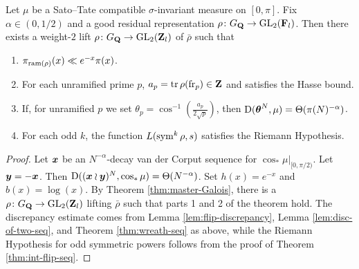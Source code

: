 \begin{theorem}
Let $\mu$ be a Sato--Tate compatible $\sigma$-invariant measure on $[0,\pi]$. 
Fix $\alpha\in (0,1/2)$ and a good residual representation 
$\rho\colon G_{\mathbf{Q}} \to \operatorname{GL}_2(\mathbf{F}_l)$. Then there exists a weight-$2$ lift 
$\rho\colon G_{\mathbf{Q}} \to \operatorname{GL}_2(\mathbf{Z}_l)$ of $\bar\rho$ such that 
\begin{enumerate}
\item
$\pi_{\mathrm{ram}(\rho)}(x) \ll e^{-x}\pi(x)$. 

\item
For each unramified prime $p$, $a_p = \operatorname{tr}\rho(\mathrm{fr}_p)\in \mathbf{Z}$ and satisfies 
the Hasse bound. 

\item
If, for unramified $p$ we set 
$\theta_p = \cos^{-1}\left(\frac{a_p}{2\sqrt p}\right)$, then 
$\operatorname{D}({\boldsymbol\theta}^N,\mu) = \Theta(\pi(N)^{-\alpha})$. 

\item
For each odd $k$, the function $L(\operatorname{sym}^k \rho,s)$ satisfies the Riemann 
Hypothesis. 
\end{enumerate}
\end{theorem}
\begin{proof}
Let ${\boldsymbol x}$ be an $N^{-\alpha}$-decay van der Corput sequence for 
$\cos_\ast \left.\mu\right|_{[0,\pi/2)}$. Let ${\boldsymbol y} = -{\boldsymbol x}$. Then 
$\operatorname{D}(({\boldsymbol x}\wr{\boldsymbol y})^N,\cos_\ast\mu) = \Theta(N^{-\alpha})$. Set $h(x) = e^{-x}$ 
and $b(x) = \log(x)$. By Theorem \ref{thm:master-Galois}, there is a 
$\rho\colon G_{\mathbf{Q}} \to \operatorname{GL}_2(\mathbf{Z}_l)$ lifting $\bar\rho$ such that parts 
1 and 2 of the theorem hold. The discrepancy estimate comes from Lemma 
\ref{lem:flip-discrepancy}, Lemma \ref{lem:disc-of-two-seq}, and Theorem 
\ref{thm:wreath-seq} as above, while the Riemann Hypothesis for odd symmetric 
powers follows from the proof of Theorem \ref{thm:int-flip-seq}. 
\end{proof}
